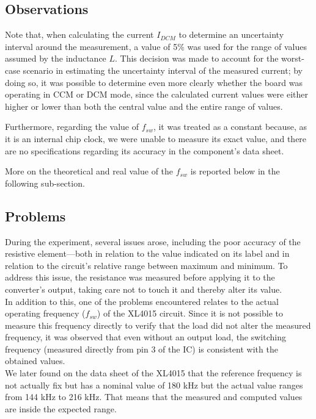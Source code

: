 \documentclass[../main.tex]{subfiles}
\begin{document}
\subsection*{Observations}

Note that, when calculating the current $I_{DCM}$ to determine an uncertainty interval around the measurement, a value of 5\% was used for the range of values assumed by the inductance $L$. This decision was made to account for the worst-case scenario in estimating the uncertainty interval of the measured current; by doing so, it was possible to determine even more clearly whether the board was operating in CCM or DCM mode, since the calculated current values were either higher or lower than both the central value and the entire range of values.

Furthermore, regarding the value of $f_{sw}$, it was treated as a constant because, as it is an internal chip clock, we were unable to measure its exact value, and there are no specifications regarding its accuracy in the component’s data sheet.

More on the theoretical and real value of the $f_{sw}$ is reported below in the following sub-section.

\subsection*{Problems}

During the experiment, several issues arose, including the poor accuracy of the resistive element—both in relation to the value indicated on its label and in relation to the circuit’s relative range between maximum and minimum. To address this issue, the resistance was measured before applying it to the converter’s output, taking care not to touch it and thereby alter its value.\\

In addition to this, one of the problems encountered relates to the actual operating frequency ($f_{sw}$) of the XL4015 circuit. Since it is not possible to measure this frequency directly to verify that the load did not alter the measured frequency, it was observed that even without an output load, the switching frequency (measured directly from pin 3 of the IC) is consistent with the obtained values.\\

We later found on the data sheet of the XL4015 that the reference frequency is not actually fix but has a nominal value of 180 kHz but the actual value ranges from 144 kHz to 216 kHz. That means that the measured and computed values are inside the expected range.
\end{document}
